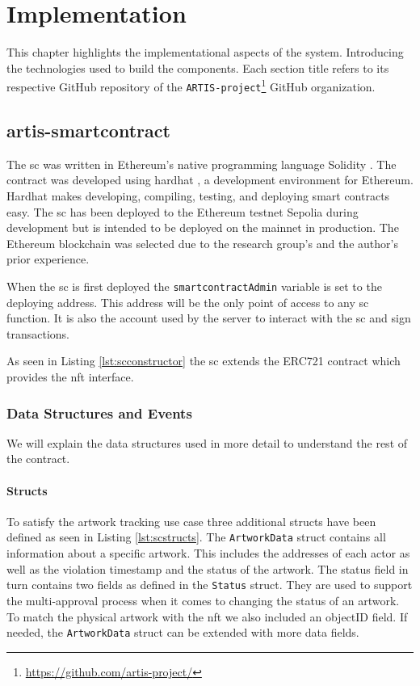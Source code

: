 \chapter{Implementation}
\label{chap:implementation}
This chapter highlights the implementational aspects of the system. Introducing the technologies used to build the components. Each section title refers to its respective GitHub repository of the \texttt{ARTIS-project}\footnote{\href{https://github.com/artis-project/}{https://github.com/artis-project/}} GitHub organization.

\section{artis-smartcontract}
The \gls{sc} was written in Ethereum's native programming language Solidity \cite{solidity}. The contract was developed using hardhat \cite{hardhat}, a development environment for Ethereum. Hardhat makes developing, compiling, testing, and deploying smart contracts easy. The \gls{sc} has been deployed to the Ethereum testnet Sepolia \cite{sepolia} during development but is intended to be deployed on the mainnet in production. The Ethereum blockchain was selected due to the research group's and the author's prior experience.

When the \gls{sc} is first deployed the \texttt{smartcontractAdmin} variable is set to the deploying address. This address will be the only point of access to any \gls{sc} function. It is also the account used by the server to interact with the \gls{sc} and sign transactions.



As seen in Listing \ref{lst:scconstructor} the \gls{sc} extends the ERC721 \cite{erc721} contract which provides the \gls{nft} interface.

\subsection{Data Structures and Events}
We will explain the data structures used in more detail to understand the rest of the contract.

\subsubsection{Structs}
To satisfy the artwork tracking use case three additional structs have been defined as seen in Listing \ref{lst:scstructs}. The \texttt{ArtworkData} struct contains all information about a specific artwork. This includes the addresses of each actor as well as the violation timestamp and the status of the artwork. The status field in turn contains two fields as defined in the \texttt{Status} struct. They are used to support the multi-approval process when it comes to changing the status of an artwork. To match the physical artwork with the \gls{nft} we also included an objectID field. If needed, the \texttt{ArtworkData} struct can be extended with more data fields.

